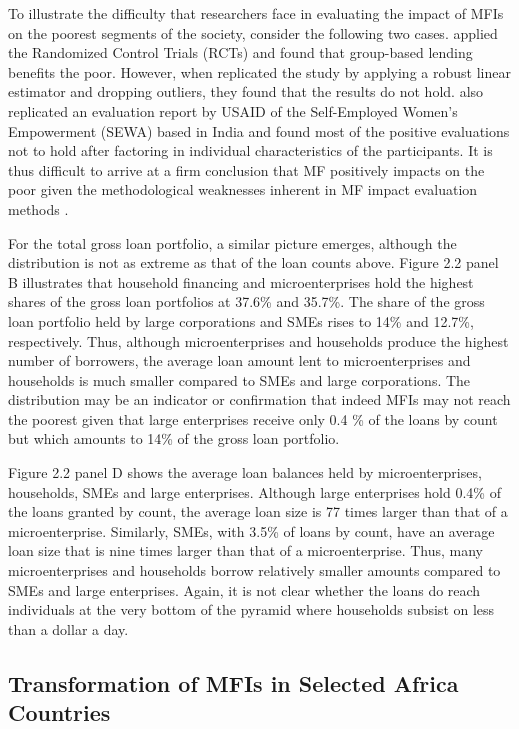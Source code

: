 \documentclass[a4paper, nobind]{templates/ociamthesis}
\begin{document}
To illustrate the difficulty that researchers face in evaluating the impact of MFIs on the poorest segments of the society, consider the following two cases. \textcite{pitt1998impact} applied the Randomized Control Trials (RCTs) and found that group-based lending benefits the poor. However, when \textcite{roodman2014impact} replicated the study by applying a robust linear estimator and dropping outliers, they found that the results do not hold. \textcite{ghosh2013microfinance} also replicated an evaluation report by USAID of the Self-Employed Women's Empowerment (SEWA) based in India and found most of the positive evaluations not to hold after factoring in individual characteristics of the participants. It is thus difficult to arrive at a firm conclusion that MF positively impacts on the poor given the methodological weaknesses inherent in MF impact evaluation methods \autocite{awaworyi2016has}.

For the total gross loan portfolio, a similar picture emerges, although the distribution is not as extreme as that of the loan counts above. Figure 2.2 panel B illustrates that household financing and microenterprises hold the highest shares of the gross loan portfolios at 37.6\% and 35.7\%. The share of the gross loan portfolio held by large corporations and SMEs rises to 14\% and 12.7\%, respectively. Thus, although microenterprises and households produce the highest number of borrowers, the average loan amount lent to microenterprises and households is much smaller compared to SMEs and large corporations. The distribution may be an indicator or confirmation that indeed MFIs may not reach the poorest given that large enterprises receive only 0.4 \% of the loans by count but which amounts to 14\% of the gross loan portfolio.

Figure 2.2 panel D shows the average loan balances held by microenterprises, households, SMEs and large enterprises. Although large enterprises hold 0.4\% of the loans granted by count, the average loan size is 77 times larger than that of a microenterprise. Similarly, SMEs, with 3.5\% of loans by count, have an average loan size that is nine times larger than that of a microenterprise. Thus, many microenterprises and households borrow relatively smaller amounts compared to SMEs and large enterprises. Again, it is not clear whether the loans do reach individuals at the very bottom of the pyramid where households subsist on less than a dollar a day.

\hypertarget{transformation-of-mfis-in-selected-africa-countries}{%
\subsection{Transformation of MFIs in Selected Africa Countries}\label{transformation-of-mfis-in-selected-africa-countries}}
\end{document}
